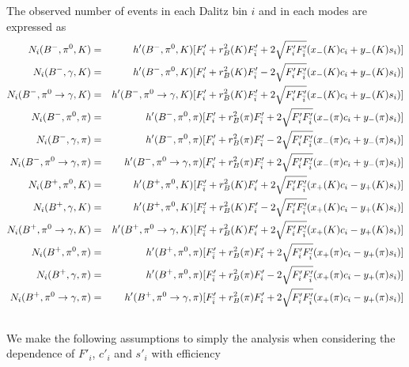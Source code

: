 The observed number of events in each Dalitz bin $i$ and in each modes are expressed as
\begin{eqnarray}
N_i({{{B}^-}}, \pi^0, K)  &=&  h'({{{B}^-}}, \pi^0, K) [ F'_i  + r^2_B(K)F'_{\bar{i}}   + 2\sqrt{F'_i F'_{\bar{i}} } (x_-(K)c_i  + y_-(K)s_i ) ]  \\\nonumber
N_i({{{B}^-}}, \gamma, K)  &=& h'({{{B}^-}}, \pi^0, K)[ F'_i  + r^2_B(K)F'_{\bar{i}}  - 2\sqrt{F'_i F'_{\bar{i}} } (x_-(K)c_i + y_-(K)s_i  ) ] \\\nonumber
N_i({{{B}^-}}, \pi^0 \rightarrow \gamma, K)  &=& h'({{{B}^-}}, \pi^0 \rightarrow \gamma, K)[ F'_i  + r^2_B(K)F'_{\bar{i}}  + 2\sqrt{F'_i F'_{\bar{i}} } (x_-(K)c_i + y_-(K)s_i  ) ] \\\nonumber
N_i({{{B}^-}}, \pi^0, \pi)  &=&  h'({{{B}^-}}, \pi^0, \pi)[ F'_i  + r^2_B(\pi)F'_{\bar{i}}   + 2\sqrt{F'_i F'_{\bar{i}} } (x_-(\pi)c_i  + y_-(\pi)s_i ) ] \\\nonumber
N_i({{{B}^-}}, \gamma, \pi)  &=& h'({{{B}^-}}, \pi^0, \pi)[ F'_i  + r^2_B(\pi)F'_{\bar{i}}  - 2\sqrt{F'_i F'_{\bar{i}} } (x_-(\pi)c_i + y_-(\pi)s_i  ) ] \\\nonumber
N_i({{{B}^-}}, \pi^0 \rightarrow \gamma, \pi)  &=& h'({{{B}^-}}, \pi^0 \rightarrow \gamma, \pi)[ F'_i  + r^2_B(\pi)F'_{\bar{i}}  + 2\sqrt{F'_i F'_{\bar{i}} } (x_-(\pi)c_i + y_-(\pi)s_i  ) ] \\\nonumber 
N_i({{{B}^+}}, \pi^0, K)  &=&  h'({{{B}^+}}, \pi^0, K)[ F'_{\bar{i}}  + r^2_B(K)F'_{i}   + 2\sqrt{F'_i F'_{\bar{i}} } (x_+(K)c_i  - y_+(K)s_i ) ]  \\\nonumber
N_i({{{B}^+}}, \gamma, K)  &=& h'({{{B}^+}}, \pi^0, K)[ F'_{\bar{i}}  + r^2_B(K)F'_i  - 2\sqrt{F'_i F'_{\bar{i}} } (x_+(K)c_i - y_+(K)s_i  ) ] \\\nonumber
N_i({{{B}^+}}, \pi^0 \rightarrow \gamma, K)  &=& h'({{{B}^+}}, \pi^0 \rightarrow \gamma, K)[ F'_{\bar{i}}  + r^2_B(K)F'_i  + 2\sqrt{F'_i F'_{\bar{i}} } (x_+(K)c_i - y_+(K)s_i  ) ] \\\nonumber
N_i({{{B}^+}}, \pi^0, \pi)  &=&  h'({{{B}^+}}, \pi^0, \pi)[ F'_{\bar{i}}  + r^2_B(\pi)F'_i   + 2\sqrt{F'_i F'_{\bar{i}} } (x_+(\pi)c_i  - y_+(\pi)s_i ) ]  \\\nonumber
N_i({{{B}^+}}, \gamma, \pi)  &=& h'({{{B}^+}}, \pi^0, \pi)[ F'_{\bar{i}}  + r^2_B(\pi)F'_i  - 2\sqrt{F'_i F'_{\bar{i}} } (x_+(\pi)c_i - y_+(\pi)s_i  ) ] \\\nonumber
N_i({{{B}^+}}, \pi^0 \rightarrow \gamma, \pi)  &=& h'({{{B}^+}}, \pi^0 \rightarrow \gamma, \pi)[ F'_{\bar{i}}  + r^2_B(\pi)F'_i  + 2\sqrt{F'_i F'_{\bar{i}} } (x_+(\pi)c_i - y_+(\pi)s_i  ) ] \\\nonumber 
 \end{eqnarray} 
 We make the following assumptions to simply the analysis when considering the dependence of $F'_i$, $c'_i$ and $s'_i$ with efficiency
